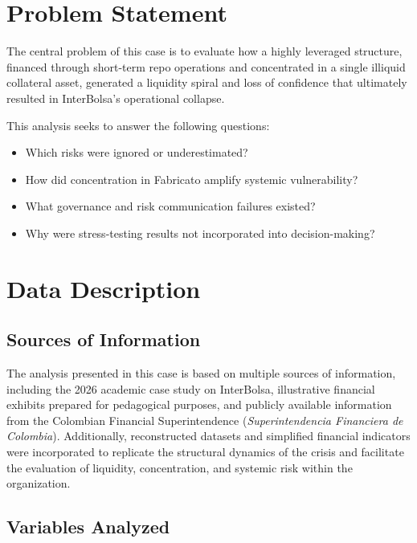 \section{Problem Statement}

The central problem of this case is to evaluate how a highly leveraged structure, financed through short-term repo operations and concentrated in a single illiquid collateral asset, generated a liquidity spiral and loss of confidence that ultimately resulted in InterBolsa's operational collapse.

This analysis seeks to answer the following questions:

\begin{itemize}
    \item Which risks were ignored or underestimated?
    \item How did concentration in Fabricato amplify systemic vulnerability?
    \item What governance and risk communication failures existed?
    \item Why were stress-testing results not incorporated into decision-making?
\end{itemize}

\vspace{0.5cm}

\section{Data Description}

\subsection{Sources of Information}

The analysis presented in this case is based on multiple sources of information, including the 2026 academic case study on InterBolsa, illustrative financial exhibits prepared for pedagogical purposes, and publicly available information from the Colombian Financial Superintendence (\textit{Superintendencia Financiera de Colombia}). Additionally, reconstructed datasets and simplified financial indicators were incorporated to replicate the structural dynamics of the crisis and facilitate the evaluation of liquidity, concentration, and systemic risk within the organization.

\subsection{Variables Analyzed}

